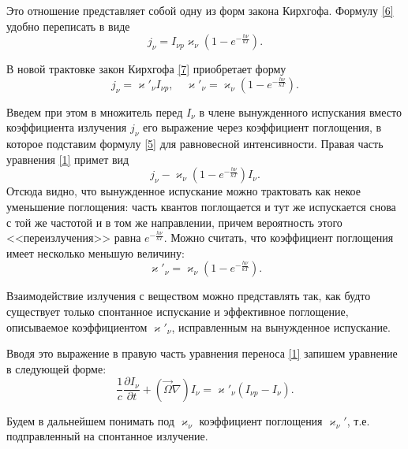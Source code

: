 Это отношение представляет собой одну из форм закона Кирхгофа. Формулу \eqref{6} удобно переписать в виде
\begin {equation}
j_{\nu} = I_{\nu p}\varkappa_{\nu}\left(1-e^{-\frac{h\nu}{kT}}\right).
\label{7}
\end {equation}

В новой трактовке закон Кирхгофа \eqref{7} приобретает форму
\begin {equation}
j_{\nu} = \varkappa'_{\nu}I_{\nu p}, \quad \varkappa'_{\nu} = \varkappa_{\nu}\left(1 - e^{-\frac{h\nu}{kT}}\right).
\end {equation}

Введем при этом в множитель перед $I_{\nu}$ в члене вынужденного испускания вместо коэффициента излучения $j_{\nu}$ его выражение через коэффициент поглощения, в которое подставим формулу \eqref{5} для равновесной интенсивности. Правая часть уравнения \eqref{1} примет вид 
\begin {equation}
j_{\nu} - \varkappa_{\nu}\left(1 - e^{-\frac{h\nu}{kT}}\right)I_{\nu}.
\end {equation}
Отсюда видно, что вынужденное испускание можно трактовать как некое уменьшение поглощения: часть квантов поглощается и тут же испускается снова с той же частотой и в том же направлении, причем вероятность этого <<переизлучения>> равна $e^{-\frac{h\nu}{kT}}$. Можно считать, что коэффициент поглощения имеет несколько меньшую величину:
\begin {equation}
\varkappa'_{\nu} = \varkappa_{\nu}\left(1 - e^{-\frac{h\nu}{kT}}\right).
\end {equation}

Взаимодействие излучения с веществом можно представлять так, как будто существует только спонтанное испускание и эффективное поглощение, описываемое коэффициентом $\varkappa'_{\nu}$, исправленным на вынужденное испускание. 

Вводя это выражение в правую часть уравнения переноса \eqref{1} запишем уравнение в следующей форме:
\begin {equation}
\frac{1}{c}\frac{\partial I_{\nu}}{\partial t} + (\vec\Omega \nabla) I_{\nu} = \varkappa'_{\nu} (I_{\nu p} - I_{\nu}).
\label{2}
\end {equation}

Будем в дальнейшем понимать под $\varkappa_\nu$ коэффициент поглощения $\varkappa_\nu'$, т.е. подправленный на спонтанное излучение.
